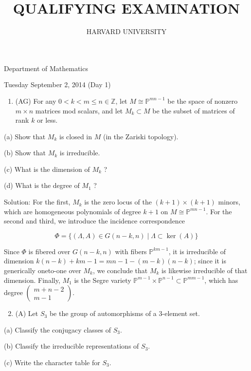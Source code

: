 \documentclass[10pt]{article}
\title{QUALIFYING EXAMINATION }
\author{HARVARD UNIVERSITY}
\date{}
\begin{document}
\maketitle
Department of Mathematics

Tuesday September 2, 2014 (Day 1)

\begin{enumerate}
  \item (AG) For any $0<k<m \leq n \in \mathbb{Z}$, let $M \cong \mathbb{P}^{m n-1}$ be the space of nonzero $m \times n$ matrices mod scalars, and let $M_{k} \subset M$ be the subset of matrices of rank $k$ or less.
\end{enumerate}

(a) Show that $M_{k}$ is closed in $M$ (in the Zariski topology).

(b) Show that $M_{k}$ is irreducible.

(c) What is the dimension of $M_{k}$ ?

(d) What is the degree of $M_{1}$ ?

Solution: For the first, $M_{k}$ is the zero locus of the $(k+1) \times(k+1)$ minors, which are homogeneous polynomials of degree $k+1$ on $M \cong \mathbb{P}^{m n-1}$. For the second and third, we introduce the incidence correspondence

$$
\Phi=\{(\Lambda, A) \in G(n-k, n) \mid \Lambda \subset \operatorname{ker}(A)\}
$$

Since $\Phi$ is fibered over $G(n-k, n)$ with fibers $\mathbb{P}^{k m-1}$, it is irreducible of dimension $k(n-k)+k m-1=m n-1-(m-k)(n-k)$; since it is generically oneto-one over $M_{k}$, we conclude that $M_{k}$ is likewise irreducible of that dimension. Finally, $M_{1}$ is the Segre variety $\mathbb{P}^{m-1} \times \mathbb{P}^{n-1} \subset \mathbb{P}^{m m-1}$, which has degree $\left(\begin{array}{c}m+n-2 \\ m-1\end{array}\right)$.

\begin{enumerate}
  \setcounter{enumi}{1}
  \item (A) Let $S_{3}$ be the group of automorphisms of a 3-element set.
\end{enumerate}

(a) Classify the conjugacy classes of $S_{3}$.

(b) Classify the irreducible representations of $S_{3}$.

(c) Write the character table for $S_{3}$.
\end{document}
